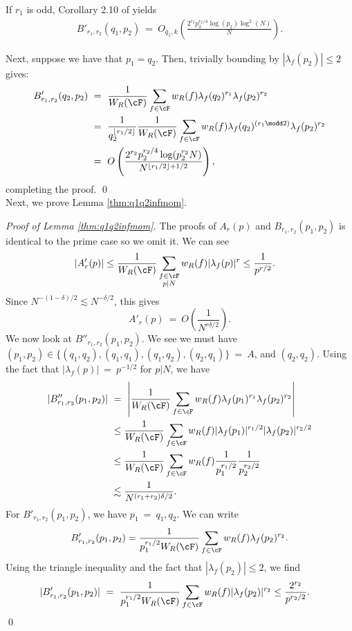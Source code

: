 \documentclass[11pt, reqno]{amsart}
\theoremstyle{definition}
\theoremstyle{remark}
\numberwithin{equation}{section}
\begin{document}
\noindent If $r_1$ is odd, Corollary 2.10 of \cite{ILS2} yields\begin{align*}
    B'_{r_1,r_2}(q_1,p_2)\ =\ O_{q_1,k}\left(\frac{2^{r_2}p_2^{r_2/4}\log(p_2)\log^2(N)}{N}\right).
\end{align*} 

\noindent Next, suppose we have that $p_1 = q_2.$ Then, trivially bounding by $|\lambda_f(p_2)| \leq 2$ gives:
\begin{align*}
     B'_{r_1,r_2}(q_2,p_2)\ &=\ \frac{1}{W_R(\cF)} \sum_{f \in \cF} w_R(f) \lambda_f(q_2)^{r_1}\lambda_f(p_2)^{r_2} \\
    &=\ \frac{1}{q_2^{\lfloor r_1/2\rfloor}} \frac{1}{W_R(\cF)} \sum_{f \in \cF} w_R(f) \lambda_f(q_2)^{(r_1 \modd 2)}\lambda_f(p_2)^{r_2} \\
    &=\  O\left(\frac{2^{r_2}p_2^{r_2/4}\log(p_2^{r_2}N)}{N^{\lfloor r_1/2\rfloor + 1/2}}\right),
\end{align*}
completing the proof. \qed \\

Next, we prove Lemma \ref{thm:q1q2infmom}.

\noindent\textit{Proof of Lemma \ref{thm:q1q2infmom}.}
The proofs of $A_r(p)$ and $B_{r_1,r_2}(p_1,p_2)$ is identical to the prime case so we omit it.
    We can see 
    \begin{align*}
        |A'_r(p)|&\leq\frac{1}{W_R(\cF)}\sum_{\substack{f \in \cF\\p|N}}w_{R}(f)|\lambda_{f}(p)|^r\leq \frac{1}{p^{r/2}}.
    \end{align*}
    Since $N^{-(1-\delta)/2}\lesssim N^{-\delta/2}$, this gives
    $$A'_r(p)\ =\ O\left(\frac{1}{N^{r\delta/2}} \right).$$
    We now look at $B''_{r_1,r_2}(p_1,p_2)$. We see we must have $(p_1,p_2)\in \{(q_1,q_2), (q_1,q_1),(q_1,q_2),(q_2,q_1)\}\ =\ A$, and $(q_2,q_2)$. Using the fact that $|\lambda_f(p)|\ =\ p^{-1/2}$ for $p|N$, we have 
    \begin{align}
       |B''_{r_1,r_2}(p_1,p_2)| \ &=\ \left|\frac{1}{W_R(\cF)}\sum_{\substack{f \in \cF }}w_R(f)\lambda_f(p_1)^{r_1}\lambda_f(p_2)^{r_2} \right|\notag \\
       &\leq \frac{1}{W_R(\cF) }\sum_{\substack{f \in \cF }}w_R(f)|\lambda_f(p_1)|^{r_1/2}|\lambda_f(p_2)|^{r_2/2} \notag \\
       &\leq \frac{1}{W_R(\cF)}\sum_{\substack{f \in \cF }}w_R(f) \frac{1}{p_1^{r_1/2}}\frac{1}{p_2^{r_2/2}} \notag \\
        &\lesssim\frac{1}{N^{(r_1+r_2)\delta/2}}.
    \end{align}
    For $B'_{r_1,r_2}(p_1,p_2)$, we have $p_1\ =\ q_1,q_2$. 
    We can write 
    $$B'_{r_1,r_2}(p_1,p_2)=\frac{1}{p_1^{r_1/2}W_R(\cF)}\sum_{\substack{f \in \cF }}w_R(f)\lambda_f(p_2)^{r_2}. \notag$$
    Using the triangle inequality and the fact that $|\lambda_f(p_2)|\leq 2$, we find 
    \begin{align}
        |B'_{r_1,r_2}(p_1,p_2)|\ &=\ \frac{1}{p_1^{r_1/2}W_R(\cF)}\sum_{\substack{f \in \cF }}w_R(f)|\lambda_f(p_2)|^{r_2} \leq\frac{2^{r_2}}{p^{r_2/2}}.
    \end{align}
  \qed 
\end{document}
